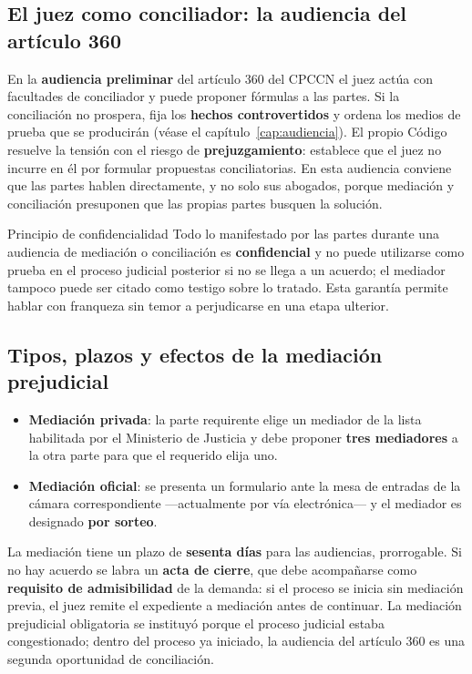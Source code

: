 \documentclass[12pt,oneside]{book}
\begin{document}
\subsection{El juez como conciliador: la audiencia del artículo 360}

En la \textbf{audiencia preliminar} del artículo 360 del CPCCN el juez actúa con facultades de conciliador y puede proponer fórmulas a las partes. Si la conciliación no prospera, fija los \textbf{hechos controvertidos} y ordena los medios de prueba que se producirán (véase el capítulo~\ref{cap:audiencia}). El propio Código resuelve la tensión con el riesgo de \textbf{prejuzgamiento}: establece que el juez no incurre en él por formular propuestas conciliatorias. En esta audiencia conviene que las partes hablen directamente, y no solo sus abogados, porque mediación y conciliación presuponen que las propias partes busquen la solución.

\begin{definition}{Principio de confidencialidad}
Todo lo manifestado por las partes durante una audiencia de mediación o conciliación es \textbf{confidencial} y no puede utilizarse como prueba en el proceso judicial posterior si no se llega a un acuerdo; el mediador tampoco puede ser citado como testigo sobre lo tratado. Esta garantía permite hablar con franqueza sin temor a perjudicarse en una etapa ulterior.
\end{definition}

\subsection{Tipos, plazos y efectos de la mediación prejudicial}

\begin{itemize}
\item \textbf{Mediación privada}: la parte requirente elige un mediador de la lista habilitada por el Ministerio de Justicia y debe proponer \textbf{tres mediadores} a la otra parte para que el requerido elija uno.
\item \textbf{Mediación oficial}: se presenta un formulario ante la mesa de entradas de la cámara correspondiente ---actualmente por vía electrónica--- y el mediador es designado \textbf{por sorteo}.
\end{itemize}

La mediación tiene un plazo de \textbf{sesenta días} para las audiencias, prorrogable. Si no hay acuerdo se labra un \textbf{acta de cierre}, que debe acompañarse como \textbf{requisito de admisibilidad} de la demanda: si el proceso se inicia sin mediación previa, el juez remite el expediente a mediación antes de continuar. La mediación prejudicial obligatoria se instituyó porque el proceso judicial estaba congestionado; dentro del proceso ya iniciado, la audiencia del artículo 360 es una segunda oportunidad de conciliación.
\end{document}

